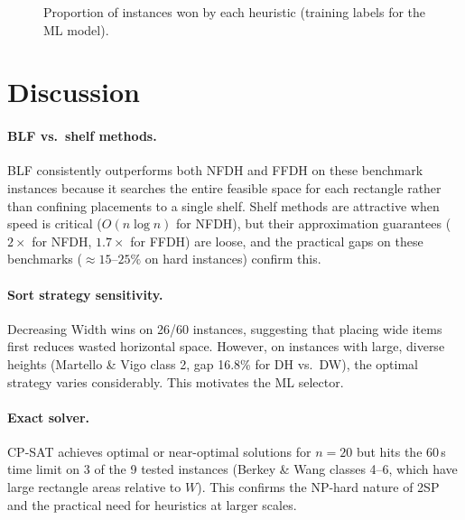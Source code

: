\documentclass[11pt,a4paper]{article}
\begin{document}
\begin{figure}[h]
\centering
{}
\caption{Proportion of instances won by each heuristic (training labels for the ML model).}
\label{fig:ml_pie}
\end{figure}

\section{Discussion}

\paragraph{BLF vs.\ shelf methods.}
BLF consistently outperforms both NFDH and FFDH on these benchmark instances
because it searches the entire feasible space for each rectangle rather than
confining placements to a single shelf.
Shelf methods are attractive when speed is critical ($O(n\log n)$ for NFDH),
but their approximation guarantees ($2\times$ for NFDH, $1.7\times$ for FFDH)
are loose, and the practical gaps on these benchmarks ($\approx 15$--$25\%$
on hard instances) confirm this.

\paragraph{Sort strategy sensitivity.}
Decreasing Width wins on 26/60 instances, suggesting that placing wide items
first reduces wasted horizontal space.
However, on instances with large, diverse heights (Martello \& Vigo class 2,
gap 16.8\% for DH vs.\ DW), the optimal strategy varies considerably.
This motivates the ML selector.

\paragraph{Exact solver.}
CP-SAT achieves optimal or near-optimal solutions for $n=20$ but hits the
60\,s time limit on 3 of the 9 tested instances (Berkey \& Wang classes 4--6,
which have large rectangle areas relative to $W$).
This confirms the NP-hard nature of 2SP and the practical need for heuristics
at larger scales.
\end{document}
